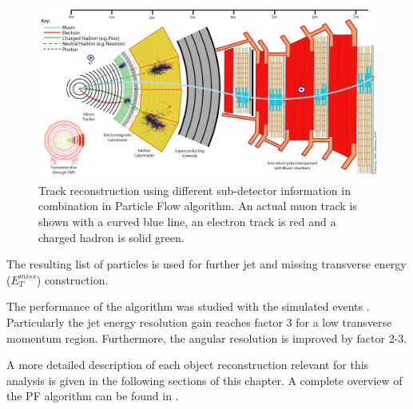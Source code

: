 \begin{figure}[t]
  \centering
  \includegraphics[width=1.0\textwidth]{04_event_reconstruction/plots/CMS_Slice.png}
  \caption{Track reconstruction using different sub-detector information in combination in Particle Flow algorithm. An actual
  muon track is shown with a curved blue line, an electron track is red and a charged hadron is solid green.}
  \label{fig:PFmuons}
\end{figure}

The resulting list of particles is used for further jet and missing transverse energy ($E_{T}^{miss}$) construction. 

The performance of the algorithm was studied with the simulated events \cite{CMS-PAS-PFT-09-001}. Particularly the jet energy
resolution gain reaches factor 3 for a low transverse momentum region. Furthermore, the angular resolution is improved by factor 2-3.

A more detailed description of each object reconstruction relevant for this analysis is given in the following sections of this chapter.
A complete overview of the PF algorithm can be found in \cite{CMS-PAS-PFT-09-001}. 

